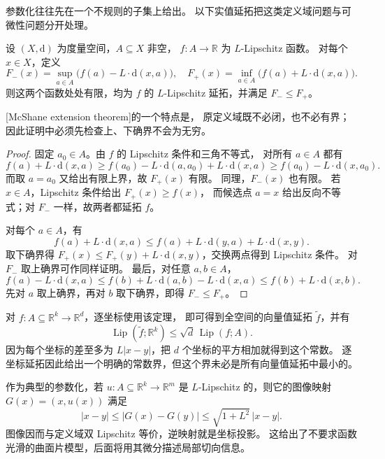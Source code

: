 \ProseParagraphBreak

参数化往往先在一个不规则的子集上给出。
以下实值延拓把这类定义域问题与可微性问题分开处理。

\begin{theorem}[McShane 延拓]\label{b1:thm:mcshane-extension}
设 \((X,\mathrm{d})\) 为度量空间，\(A\subseteq X\) 非空，
\(f:A\rightarrow\mathbb R\) 为 \(L\)-Lipschitz 函数。
对每个 \(x\in X\)，定义
\[
 F_-(x)=\sup_{a\in A}\bigl(f(a)-L\cdot \mathrm{d}(x,a)\bigr),
 \quad
 F_+(x)=\inf_{a\in A}\bigl(f(a)+L\cdot \mathrm{d}(x,a)\bigr).
\]
则这两个函数处处有限，均为 \(f\) 的 \(L\)-Lipschitz 延拓，并满足 \(F_-\leq F_+\)。
\end{theorem}
[McShane extension theorem]的一个特点是，
原定义域既不必闭，也不必有界；因此证明中必须先检查上、下确界不会为无穷。

\begin{proof}
固定 \(a_0\in A\)。由 \(f\) 的 Lipschitz 条件和三角不等式，
对所有 \(a\in A\) 都有
\[
 f(a)+L\cdot \mathrm{d}(x,a)
 \geq f(a_0)-L\cdot \mathrm{d}(a,a_0)+L\cdot \mathrm{d}(x,a)
 \geq f(a_0)-L\cdot \mathrm{d}(x,a_0).
\]
而取 \(a=a_0\) 又给出有限上界，故 \(F_+(x)\) 有限。
同理，\(F_-(x)\) 也有限。
若 \(x\in A\)，Lipschitz 条件给出 \(F_+(x)\geq f(x)\)，
而候选点 \(a=x\) 给出反向不等式；对 \(F_-\) 一样，故两者都延拓 \(f\)。

对每个 \(a\in A\)，有
\[
 f(a)+L\cdot \mathrm{d}(x,a)\leq f(a)+L\cdot \mathrm{d}(y,a)+L\cdot \mathrm{d}(x,y).
\]
取下确界得 \(F_+(x)\leq F_+(y)+L\cdot \mathrm{d}(x,y)\)，交换两点得到 Lipschitz 条件。
对 \(F_-\) 取上确界可作同样证明。
最后，对任意 \(a,b\in A\)，
\[
 f(a)-L\cdot \mathrm{d}(x,a)
 \leq f(b)+L\cdot \mathrm{d}(a,b)-L\cdot \mathrm{d}(x,a)
 \leq f(b)+L\cdot \mathrm{d}(x,b).
\]
先对 \(a\) 取上确界，再对 \(b\) 取下确界，即得 \(F_-\leq F_+\)。
\end{proof}

对 \(f:A\subseteq\mathbb R^k\rightarrow\mathbb R^d\)，逐坐标使用该定理，
即可得到全空间的向量值延拓 \(\widetilde f\)，并有
\[
 \operatorname{Lip}(\widetilde f;\mathbb R^k)\leq\sqrt d\,\operatorname{Lip}(f;A).
\]
因为每个坐标的差至多为 \(L|x-y|\)，把 \(d\) 个坐标的平方相加就得到这个常数。
逐坐标延拓因此给出一个明确的常数界，但这个界未必是所有向量值延拓中最小的。

\ProseParagraphBreak

作为典型的参数化，若 \(u:A\subseteq\mathbb R^k\rightarrow\mathbb R^m\)
是 \(L\)-Lipschitz 的，则它的图像映射 \(G(x)=(x,u(x))\) 满足
\[
 |x-y|\leq|G(x)-G(y)|\leq\sqrt{1+L^2}\,|x-y|.
\]
图像因而与定义域双 Lipschitz 等价，逆映射就是坐标投影。
这给出了不要求函数光滑的曲面片模型，后面将用其微分描述局部切向信息。

